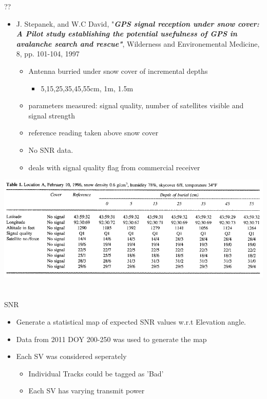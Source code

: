 \documentclass{beamer}
\begin{document}
\begin{frame}{??}
  \begin{itemize}
  \item J. Stepanek, and W.C David, "\emph{\bf GPS signal reception under snow cover: A Pilot study establishing the potential usefulness of GPS in avalanche search and rescue"}, Wilderness and Environemental Medicine, 8, pp. 101-104, 1997
    \begin{itemize}
    \item Antenna burried under snow cover of incremental depths
      \begin{itemize}
         \item 5,15,25,35,45,55cm, 1m, 1.5m
      \end{itemize}
    \item parameters measured: signal quality, number of satellites visible and signal strength
    \item reference reading taken above snow cover
    \item No SNR data.
    \item deals with signal quality flag from commercial receiver
    \end{itemize}
  \end{itemize}

\end{frame}

\begin{frame}
  \includegraphics[width=1\linewidth,clip=true]{paper_snow_cover_tbl1.png}
\end{frame}


\section[SNR]{}
\begin{frame}{SNR}
  \begin{itemize}
  \item Generate a statistical map of expected SNR values w.r.t Elevation angle.
  \item Data from 2011 DOY 200-250 was used to generate the map
  \item Each SV was considered seperately
    \begin{itemize}
    \item Individual Tracks could be tagged as 'Bad'
    \item Each SV has varying transmit power
    \end{itemize}
  \end{itemize}
\end{frame}
\end{document}
